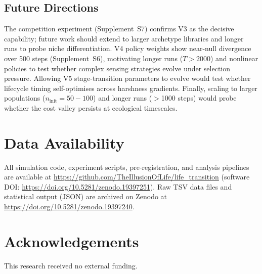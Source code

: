 \documentclass[letterpaper]{article}
\begin{document}
\subsection{Future Directions}

The competition experiment (Supplement~S7) confirms V3 as the decisive
capability; future work should extend to larger archetype libraries and
longer runs to probe niche differentiation.
V4 policy weights show near-null divergence over 500 steps (Supplement~S6),
motivating longer runs ($T\!>\!2000$) and nonlinear policies to test
whether complex sensing strategies evolve under selection pressure.
Allowing V5 stage-transition parameters to evolve would test whether
lifecycle timing self-optimises across harshness gradients.
Finally, scaling to larger populations ($n_\text{init}\!=\!50{-}100$) and
longer runs ($>$1000 steps) would probe whether the cost valley persists
at ecological timescales.

\section*{Data Availability}

All simulation code, experiment scripts, pre-registration, and analysis
pipelines are available at
\url{https://github.com/TheIllusionOfLife/life_transition}
(software DOI: \url{https://doi.org/10.5281/zenodo.19397251}).
Raw TSV data files and statistical output (JSON) are archived on
Zenodo at \url{https://doi.org/10.5281/zenodo.19397240}.

\section*{Acknowledgements}

This research received no external funding.


\footnotesize


\end{document}
